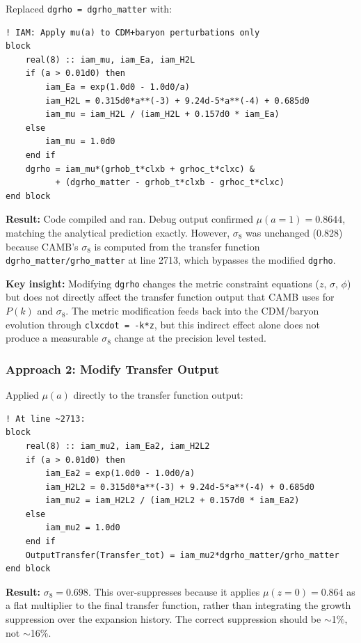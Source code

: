 \documentclass[11pt,letterpaper]{article}
\begin{document}
Replaced \texttt{dgrho = dgrho\_matter} with:

\begin{lstlisting}
! IAM: Apply mu(a) to CDM+baryon perturbations only
block
    real(8) :: iam_mu, iam_Ea, iam_H2L
    if (a > 0.01d0) then
        iam_Ea = exp(1.0d0 - 1.0d0/a)
        iam_H2L = 0.315d0*a**(-3) + 9.24d-5*a**(-4) + 0.685d0
        iam_mu = iam_H2L / (iam_H2L + 0.157d0 * iam_Ea)
    else
        iam_mu = 1.0d0
    end if
    dgrho = iam_mu*(grhob_t*clxb + grhoc_t*clxc) &
          + (dgrho_matter - grhob_t*clxb - grhoc_t*clxc)
end block
\end{lstlisting}

\textbf{Result:} Code compiled and ran. Debug output confirmed $\mu(a=1) = 0.8644$, matching the analytical prediction exactly. However, $\sigma_8$ was unchanged (0.828) because CAMB's $\sigma_8$ is computed from the transfer function \texttt{dgrho\_matter/grho\_matter} at line 2713, which bypasses the modified \texttt{dgrho}.

\textbf{Key insight:} Modifying \texttt{dgrho} changes the metric constraint equations ($z$, $\sigma$, $\phi$) but does not directly affect the transfer function output that CAMB uses for $P(k)$ and $\sigma_8$. The metric modification feeds back into the CDM/baryon evolution through \texttt{clxcdot = -k*z}, but this indirect effect alone does not produce a measurable $\sigma_8$ change at the precision level tested.

\subsubsection{Approach 2: Modify Transfer Output}

Applied $\mu(a)$ directly to the transfer function output:

\begin{lstlisting}
! At line ~2713:
block
    real(8) :: iam_mu2, iam_Ea2, iam_H2L2
    if (a > 0.01d0) then
        iam_Ea2 = exp(1.0d0 - 1.0d0/a)
        iam_H2L2 = 0.315d0*a**(-3) + 9.24d-5*a**(-4) + 0.685d0
        iam_mu2 = iam_H2L2 / (iam_H2L2 + 0.157d0 * iam_Ea2)
    else
        iam_mu2 = 1.0d0
    end if
    OutputTransfer(Transfer_tot) = iam_mu2*dgrho_matter/grho_matter
end block
\end{lstlisting}

\textbf{Result:} $\sigma_8 = 0.698$. This over-suppresses because it applies $\mu(z=0) = 0.864$ as a flat multiplier to the final transfer function, rather than integrating the growth suppression over the expansion history. The correct suppression should be $\sim$1\%, not $\sim$16\%.
\end{document}
